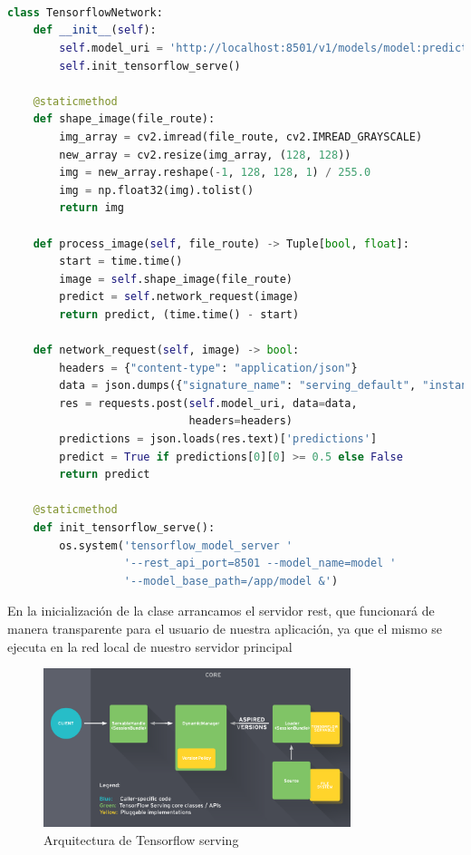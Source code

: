 \begin{lstlisting}[caption=Clase de Tensorflow de la aplicación del trabajo.,
  label=a_label,
  language=python]



class TensorflowNetwork:
    def __init__(self):
        self.model_uri = 'http://localhost:8501/v1/models/model:predict'
        self.init_tensorflow_serve()

    @staticmethod
    def shape_image(file_route):
        img_array = cv2.imread(file_route, cv2.IMREAD_GRAYSCALE)
        new_array = cv2.resize(img_array, (128, 128))
        img = new_array.reshape(-1, 128, 128, 1) / 255.0
        img = np.float32(img).tolist()
        return img

    def process_image(self, file_route) -> Tuple[bool, float]:
        start = time.time()
        image = self.shape_image(file_route)
        predict = self.network_request(image)
        return predict, (time.time() - start)

    def network_request(self, image) -> bool:
        headers = {"content-type": "application/json"}
        data = json.dumps({"signature_name": "serving_default", "instances": image})
        res = requests.post(self.model_uri, data=data,
                            headers=headers)
        predictions = json.loads(res.text)['predictions']
        predict = True if predictions[0][0] >= 0.5 else False
        return predict

    @staticmethod
    def init_tensorflow_serve():
        os.system('tensorflow_model_server '
                  '--rest_api_port=8501 --model_name=model '
                  '--model_base_path=/app/model &')
\end{lstlisting}
En la inicialización de la clase arrancamos el servidor rest, que funcionará de manera transparente para el usuario de nuestra aplicación, ya que el mismo se ejecuta en la red
local de nuestro servidor principal


\begin{figure}[h]
    \centering
    \includegraphics[width=0.8\textwidth]{images/chapter3/tf_serving_architecture.png}
    \caption{Arquitectura de Tensorflow serving}
    \label{fig:Arquitectura de Tensorflow serving}
\end{figure}

